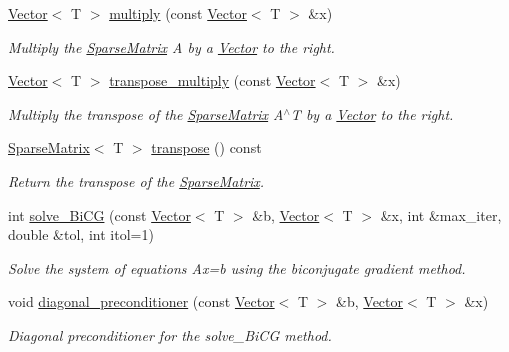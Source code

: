 \begin{DoxyCompactItemize}
\hyperlink{classLuna_1_1Vector}{Vector}$<$ T $>$ \hyperlink{classLuna_1_1SparseMatrix_a532c8a8b80b0accf950a642344e7954f}{multiply} (const \hyperlink{classLuna_1_1Vector}{Vector}$<$ T $>$ \&x)
\begin{DoxyCompactList}\small\item\em Multiply the \hyperlink{classLuna_1_1SparseMatrix}{Sparse\+Matrix} A by a \hyperlink{classLuna_1_1Vector}{Vector} to the right. \end{DoxyCompactList}\item 
\hyperlink{classLuna_1_1Vector}{Vector}$<$ T $>$ \hyperlink{classLuna_1_1SparseMatrix_a64e3d0328b1eaba4f2f75e70b4fe1bb8}{transpose\+\_\+multiply} (const \hyperlink{classLuna_1_1Vector}{Vector}$<$ T $>$ \&x)
\begin{DoxyCompactList}\small\item\em Multiply the transpose of the \hyperlink{classLuna_1_1SparseMatrix}{Sparse\+Matrix} A$^\wedge$T by a \hyperlink{classLuna_1_1Vector}{Vector} to the right. \end{DoxyCompactList}\item 
\hyperlink{classLuna_1_1SparseMatrix}{Sparse\+Matrix}$<$ T $>$ \hyperlink{classLuna_1_1SparseMatrix_a7d7f39bd0b3ef94abc483ccbfe81dcf2}{transpose} () const
\begin{DoxyCompactList}\small\item\em Return the transpose of the \hyperlink{classLuna_1_1SparseMatrix}{Sparse\+Matrix}. \end{DoxyCompactList}\item 
int \hyperlink{classLuna_1_1SparseMatrix_a297ae5c1478fec5792b11ea51a62b120}{solve\+\_\+\+Bi\+CG} (const \hyperlink{classLuna_1_1Vector}{Vector}$<$ T $>$ \&b, \hyperlink{classLuna_1_1Vector}{Vector}$<$ T $>$ \&x, int \&max\+\_\+iter, double \&tol, int itol=1)
\begin{DoxyCompactList}\small\item\em Solve the system of equations Ax=b using the biconjugate gradient method. \end{DoxyCompactList}\item 
void \hyperlink{classLuna_1_1SparseMatrix_a121eb7123d978c34b9597748f50410cd}{diagonal\+\_\+preconditioner} (const \hyperlink{classLuna_1_1Vector}{Vector}$<$ T $>$ \&b, \hyperlink{classLuna_1_1Vector}{Vector}$<$ T $>$ \&x)
\begin{DoxyCompactList}\small\item\em Diagonal preconditioner for the solve\+\_\+\+Bi\+CG method. \end{DoxyCompactList}\item 

\end{DoxyCompactItemize}
